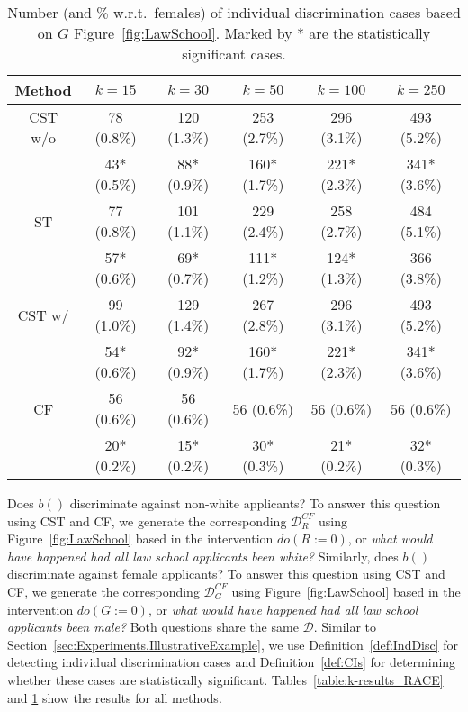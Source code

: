 %
\begin{table}[t]
\caption{Number (and \% w.r.t.~females) of individual discrimination cases based on $G$ Figure~\ref{fig:LawSchool}. Marked by * are the statistically significant cases.}
  \label{table:k-results_GENDER}
  \centering
  \begin{tabular}{cccccc}
    \toprule
    Method & $k=15$ & $k=30$ & $k=50$ & $k=100$ & $k=250$\\
    \midrule
    CST w/o & 78 (0.8\%) & 120 (1.3\%) & 253 (2.7\%) & 296 (3.1\%)  & 493 (5.2\%) \\
     & 43* (0.5\%) & 88* (0.9\%) & 160* (1.7\%) & 221* (2.3\%)  & 341* (3.6\%) \\
     \midrule
    ST & 77 (0.8\%) & 101 (1.1\%) & 229 (2.4\%) & 258 (2.7\%) & 484 (5.1\%) \\
    & 57* (0.6\%) & 69* (0.7\%) & 111* (1.2\%) & 124* (1.3\%) & 366 (3.8\%) \\
    \midrule
    CST w/ & 99 (1.0\%) & 129 (1.4\%) & 267 (2.8\%) & 296 (3.1\%)  & 493 (5.2\%)\\
    & 54* (0.6\%) & 92* (0.9\%) & 160* (1.7\%) & 221* (2.3\%)  & 341* (3.6\%) \\
    \midrule
    CF & 56 (0.6\%) & 56 (0.6\%) & 56 (0.6\%) &  56 (0.6\%) &  56 (0.6\%) \\
    & 20* (0.2\%) & 15* (0.2\%) & 30* (0.3\%) & 21* (0.2\%) & 32* (0.3\%) \\
    \bottomrule
  \end{tabular}
\end{table}
%

Does $b()$ discriminate against non-white applicants? 
To answer this question using CST and CF, we generate the corresponding $\mathcal{D}^{CF}_R$ using Figure~\ref{fig:LawSchool} based in the intervention $do(R:=0)$, or \textit{what would have happened had all law school applicants been white?}
Similarly, does $b()$ discriminate against female applicants?
To answer this question using CST and CF, we generate the corresponding $\mathcal{D}^{CF}_G$ using Figure~\ref{fig:LawSchool} based in the intervention $do(G:=0)$, or \textit{what would have happened had all law school applicants been male?}
Both questions share the same $\mathcal{D}$.
Similar to Section~\ref{sec:Experiments.IllustrativeExample}, we use Definition~\ref{def:IndDisc} for detecting individual discrimination cases and Definition~\ref{def:CIs} for determining whether these cases are statistically significant.
Tables~\ref{table:k-results_RACE} and \ref{table:k-results_GENDER} show the results for all methods.
 
